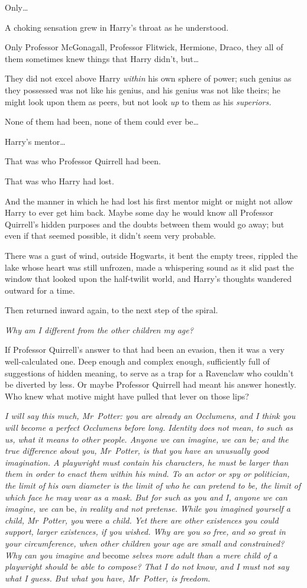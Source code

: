 Only…

A choking sensation grew in Harry’s throat as he understood.

Only Professor McGonagall, Professor Flitwick, Hermione, Draco, they all of them sometimes knew things that Harry didn’t, but…

They did not excel above Harry \emph{within} his own sphere of power; such genius as they possessed was not like his genius, and his genius was not like theirs; he might look upon them as peers, but not look \emph{up} to them as his \emph{superiors.}

None of them had been, none of them could ever be…

Harry’s mentor…

That was who Professor Quirrell had been.

That was who Harry had lost.

And the manner in which he had lost his first mentor might or might not allow Harry to ever get him back. Maybe some day he would know all Professor Quirrell’s hidden purposes and the doubts between them would go away; but even if that seemed possible, it didn’t seem very probable.

There was a gust of wind, outside Hogwarts, it bent the empty trees, rippled the lake whose heart was still unfrozen, made a whispering sound as it slid past the window that looked upon the half-twilit world, and Harry’s thoughts wandered outward for a time.

Then returned inward again, to the next step of the spiral.

\emph{Why am I different from the other children my age?}

If Professor Quirrell’s answer to that had been an evasion, then it was a very well-calculated one. Deep enough and complex enough, sufficiently full of suggestions of hidden meaning, to serve as a trap for a Ravenclaw who couldn’t be diverted by less. Or maybe Professor Quirrell had meant his answer honestly. Who knew what motive might have pulled that lever on those lips?

\emph{I will say this much, Mr~Potter: you are already an Occlumens, and I think you will become a perfect Occlumens before long. Identity does not mean, to such as us, what it means to other people. Anyone we can imagine, we can be; and the true difference about you, Mr~Potter, is that you have an unusually good imagination. A playwright must contain his characters, he must be larger than them in order to enact them within his mind. To an actor or spy or politician, the limit of his own diameter is the limit of who he can pretend to be, the limit of which face he may wear as a mask. But for such as you and I, anyone we can imagine, we can} be, \emph{in reality and not pretense. While you imagined yourself a child, Mr~Potter, you} were \emph{a child. Yet there are other existences you could support, larger existences, if you wished. Why are you so free, and so great in your circumference, when other children your age are small and constrained? Why can you imagine and} become \emph{selves more adult than a mere child of a playwright should be able to compose? That I do not know, and I must not say what I guess. But what you have, Mr~Potter, is freedom.}

